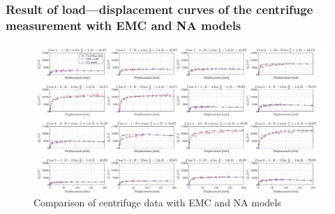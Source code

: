 \documentclass[a4paper, nobind]{templates/ociamthesis}
\begin{document}
\begin{landscape}

\hypertarget{result-of-loaddisplacement-curves-of-the-centrifuge-measurement-with-emc-and-na-models}{%
\subsubsection{Result of load---displacement curves of the centrifuge measurement with EMC and NA models}\label{result-of-loaddisplacement-curves-of-the-centrifuge-measurement-with-emc-and-na-models}}

\begin{figure}[H]
\includegraphics[width=1\linewidth]{myfigureeeeee/Comparison_of_centrifuge_data_with_EMC_and_NA_models} \caption{Comparison of centrifuge data with EMC and NA models}\label{fig:unnamed-chunk-47}
\end{figure}

\end{landscape}

\startappendices
\end{document}
